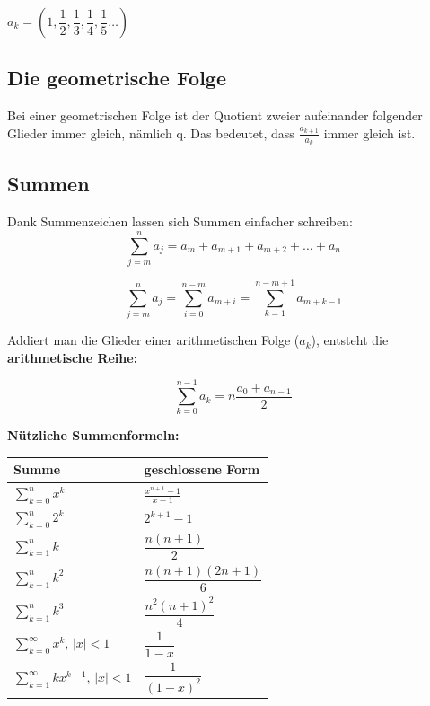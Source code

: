 \documentclass[12pt]{scrartcl}
\begin{document}
$a_k = \left(1,  \dfrac{1}{2}, \dfrac{1}{3}, \dfrac{1}{4}, \dfrac{1}{5}\dots\right)$


\subsection{Die geometrische Folge}
Bei einer geometrischen Folge ist der Quotient zweier aufeinander folgender Glieder immer
gleich, nämlich q. Das bedeutet, dass $\frac{a_{k+1}}{a_k}$ immer gleich ist.


\subsection{Summen}
Dank Summenzeichen lassen sich Summen einfacher schreiben:
\[\sum_{j=m}^{n} a_j = a_m + a_{m+1} + a_{m+2} + \dots + a_n\]

\[\sum_{j=m}^{n} a_j = \sum_{i=0}^{n-m} a_{m+i} = \sum_{k=1}^{n-m+1} a_{m+k-1}\]


Addiert man die Glieder einer arithmetischen Folge ($a_k$), entsteht die \textbf{arithmetische Reihe:}

\[\sum_{k=0}^{n-1} a_k = n \frac{a_0 + a_{n-1}}{2}\]


\newpage
\textbf{Nützliche Summenformeln:}

\renewcommand{\arraystretch}{2.5}
\begin{center}
    \begin{tabular}{  m{10em} | P{10em} }
        \hline
        Summe & geschlossene Form \\
        \hline
        $\sum_{k=0}^{n} x^k$                        & $\frac{x^{n + 1} - 1}{x - 1}$               \\ 
        $\sum_{k=0}^{n} 2^k$                        & $2^{k + 1} - 1$               \\ 
        $\sum_{k=1}^{n} k$                          & $\dfrac{n(n + 1)}{2}$         \\ 
        $\sum_{k=1}^{n} k^2$                        & $\dfrac{n(n + 1)(2n + 1)}{6}$ \\ 
        $\sum_{k=1}^{n} k^3$                        & $\dfrac{n^2(n + 1)^2}{4}$     \\ 
        $\sum_{k=0}^{\infty} x^k$, $|x| < 1$        & $\dfrac{1}{1 - x}$            \\ 
        $\sum_{k=1}^{\infty} kx^{k-1}$, $|x| < 1$   & $\dfrac{1}{(1-x)^2}$          \\ 
        \hline
    \end{tabular}
\end{center}
\end{document}
